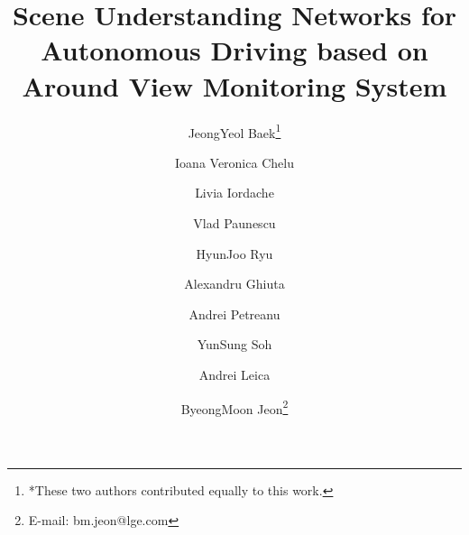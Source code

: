 \documentclass[10pt,twocolumn,letterpaper]{article}
\begin{document}
\title{Scene Understanding Networks for Autonomous Driving based on Around View Monitoring System}




\renewcommand\footnotemark{}
\author[1,*]{JeongYeol Baek\thanks{*\:These two authors contributed equally to this work.}}
\author[2,*]{Ioana Veronica Chelu}
\author[2]{Livia Iordache}
\author[2]{Vlad Paunescu}
\author[1]{HyunJoo Ryu}
\author[2]{Alexandru Ghiuta}
\author[2]{Andrei Petreanu}
\author[1]{YunSung Soh}
\author[2]{Andrei Leica}
\author[1,\dag]{ByeongMoon Jeon\thanks{\dag\: E-mail: bm.jeon@lge.com}}






\maketitle
\thispagestyle{empty}
\end{document}

